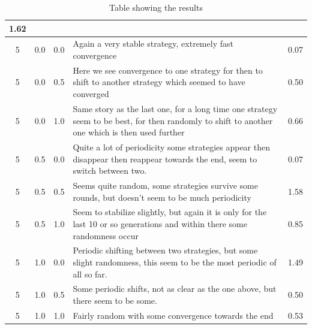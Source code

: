 \begin{landscape}
\begin{table}
\begin{tabular}{| c | c | c | p{10cm} | c |}
	1.62 \\
	\hline
	5 & 0.0 & 0.0 & Again a very stable strategy, extremely fast convergence
	  & 0.07 \\
	\hline
	5 & 0.0 & 0.5 & Here we see convergence to one strategy for then to
     shift to another strategy which seemed to have converged & 0.50 \\
	\hline
	5 & 0.0 & 1.0 & Same story as the last one, for a long time one strategy
	  seem to be best, for then randomly to shift to another one which is
	  then used further & 0.66 \\
	\hline
	5 & 0.5 & 0.0 & Quite a lot of periodicity some strategies appear then
	disappear then reappear towards the end, seem to switch between two. &
	0.07 \\
	\hline
	5 & 0.5 & 0.5 & Seems quite random, some strategies survive some rounds,
	  but doesn't seem to be much periodicity & 1.58 \\
	\hline
	5 & 0.5 & 1.0 & Seem to stabilize slightly, but again it is only for the
	  last 10 or so generations and within there some randomness occur &
	0.85 \\
	\hline
	5 & 1.0 & 0.0 & Periodic shifting between two strategies, but some
    slight randomness, this seem to be the most periodic of all so far. & 1.49 \\
	\hline
	5 & 1.0 & 0.5 & Some periodic shifts, not as clear as the one above, but
	  there seem to be some. & 0.50 \\
	\hline
	5 & 1.0 & 1.0 & Fairly random with some convergence towards the end &
	0.53 \\
	\hline
\end{tabular}
	\label{tab:blotto}
	\caption{Table showing the results}
\end{table}
\end{landscape}
